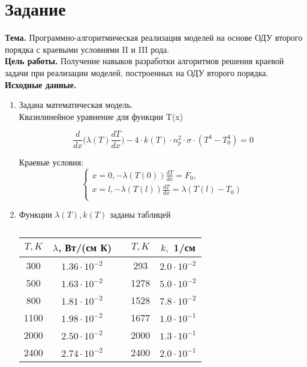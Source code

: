 \chapter*{Задание}

\textbf{Тема. } Программно-алгоритмическая реализация моделей на основе ОДУ второго порядка
с краевыми условиями II и III рода.\\

\textbf{Цель работы. } Получение навыков разработки алгоритмов решения краевой задачи при
реализации моделей, построенных на ОДУ второго порядка. \\

\textbf{Исходные данные. }\\
\begin{enumerate}
	\item Задана математическая модель. \\
	Квазилинейное уравнение для функции T(x)
	
	\begin{equation}\label{formula1}
		\frac{d}{dx}\bigg(\lambda(T)\frac{dT}{dx}\bigg) - 4 \cdot k(T) \cdot n_p^{2} \cdot \sigma \cdot (T^4 - T_0^4) = 0
	\end{equation}

	Краевые условия:
	\begin{equation}\label{formula2}
		\left\{
		\begin{array}{ccc}
			x = 0, -\lambda(T(0))\frac{dT}{dx} = F_0,\\
			x = l, -\lambda(T(l))\frac{dT}{dx} = \lambda(T(l) - T_0) \\
		\end{array}
		\right.
	\end{equation}

	\item Функции $\lambda(T), k(T)$ заданы таблицей
	\begin{table}[ph!]\label{table_1}
		\caption{}
		\centering
		\begin{tabular}{|c|c|c|c|c|}
			\hline
			$T, K$ & $\lambda$, Вт/(см К) & & $T, K$ & $k,$ 1/см\\
			\hline
			300 & $1.36 \cdot 10^{-2}$ && 293 & $2.0 \cdot 10^{-2}$\\
			\hline
			500 & $1.63 \cdot 10^{-2}$ && 1278 & $5.0 \cdot 10^{-2}$\\
			\hline
			800 & $1.81 \cdot 10^{-2}$ && 1528 & $7.8 \cdot 10^{-2}$ \\
			\hline
			1100 & $1.98 \cdot 10^{-2}$ && 1677 & $1.0 \cdot 10^{-1}$ \\
			\hline
			2000 & $2.50 \cdot 10^{-2}$ && 2000 & $1.3 \cdot 10^{-1}$ \\
			\hline
			2400 & $2.74 \cdot 10^{-2}$ && 2400 & $2.0 \cdot 10^{-1}$ \\
			\hline
	

\end{tabular}
\end{table}
\end{enumerate}
